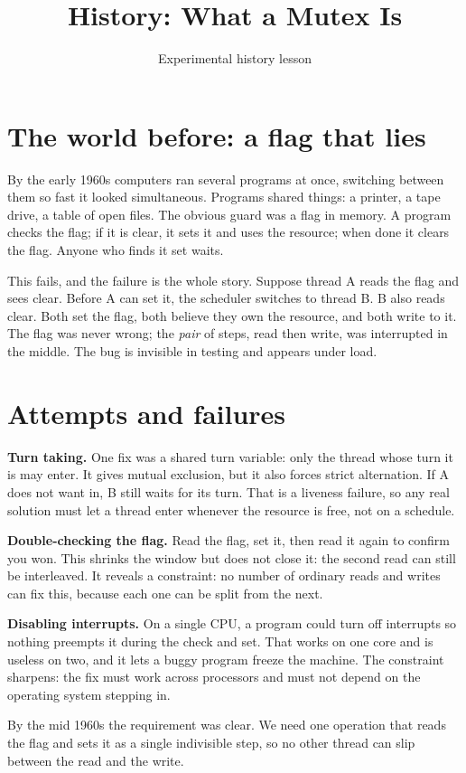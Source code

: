 \documentclass[11pt]{article}
\title{History: What a Mutex Is}
\author{}
\date{Experimental history lesson}
\begin{document}
\maketitle

\section{The world before: a flag that lies}
By the early 1960s computers ran several programs at once, switching between them so fast it looked simultaneous. Programs shared things: a printer, a tape drive, a table of open files. The obvious guard was a flag in memory. A program checks the flag; if it is clear, it sets it and uses the resource; when done it clears the flag. Anyone who finds it set waits.

This fails, and the failure is the whole story. Suppose thread A reads the flag and sees clear. Before A can set it, the scheduler switches to thread B. B also reads clear. Both set the flag, both believe they own the resource, and both write to it. The flag was never wrong; the \emph{pair} of steps, read then write, was interrupted in the middle. The bug is invisible in testing and appears under load.

\section{Attempts and failures}
\textbf{Turn taking.} One fix was a shared turn variable: only the thread whose turn it is may enter. It gives mutual exclusion, but it also forces strict alternation. If A does not want in, B still waits for its turn. That is a liveness failure, so any real solution must let a thread enter whenever the resource is free, not on a schedule.

\textbf{Double-checking the flag.} Read the flag, set it, then read it again to confirm you won. This shrinks the window but does not close it: the second read can still be interleaved. It reveals a constraint: no number of ordinary reads and writes can fix this, because each one can be split from the next.

\textbf{Disabling interrupts.} On a single CPU, a program could turn off interrupts so nothing preempts it during the check and set. That works on one core and is useless on two, and it lets a buggy program freeze the machine. The constraint sharpens: the fix must work across processors and must not depend on the operating system stepping in.

By the mid 1960s the requirement was clear. We need one operation that reads the flag and sets it as a single indivisible step, so no other thread can slip between the read and the write.
\end{document}
